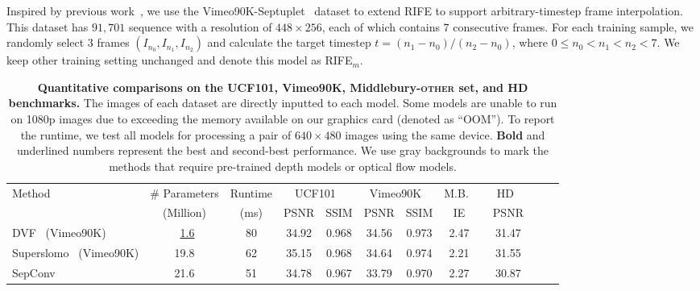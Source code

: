 \documentclass[final]{cvpr}
\def\red#1{\textcolor{MyRed}{#1}}
\def\blue#1{\textcolor{MyBlue}{#1}}
\def\first#1{\red{\textbf{#1}}}
\def\second#1{\blue{\underline{#1}}}
\begin{document}
Inspired by previous work~\cite{kalluri2020flavr, cheng2020multiple}, we use the Vimeo90K-Septuplet~\cite{xue2019video} dataset to extend RIFE to support arbitrary-timestep frame interpolation. This dataset has $91,701$ sequence with a resolution of $448\times256$, each of which contains $7$ consecutive frames. For each training sample, we randomly select $3$ frames $(I_{n_0}, I_{n_1}, I_{n_2})$ and calculate the target timestep $t = (n_1 - n_0) / (n_2 - n_0)$, where $0\leq n_0 < n_1 < n_2 < 7$. We keep other training setting unchanged and denote this model as RIFE$_m$.  	
\begin{table*}
\caption{
		\textbf{Quantitative comparisons on the UCF101, Vimeo90K, Middlebury-\textsc{other} set, and HD benchmarks.} The images of each dataset are directly inputted to each model. Some models are unable to run on 1080p images due to exceeding the memory available on our graphics card (denoted as “OOM”). To report the runtime, we test all models for processing a pair of $640\times 480$ images using the same device. \first{Bold} and \blue{underlined} numbers represent the best and second-best performance. We use gray backgrounds to mark the methods that require pre-trained depth models or optical flow models.
	}
\centering
	\begin{tabular}{lcccccccccc}
		\toprule
\multirow{2}{*}[-0.28em]{Method}  &\# Parameters&
		Runtime
&\multicolumn{2}{c}{UCF101~\cite{soomro2012ucf101}} &\multicolumn{2}{c}{Vimeo90K~\cite{xue2019video}} & M.B.~\cite{baker2011database} & ~~HD~\cite{bao2019depth}~~\\


		
		\cmidrule(l{7pt}r{7pt}){4-5}
		\cmidrule(l{7pt}r{7pt}){6-7}
		\cmidrule(l{5pt}r{5pt}){8-8}
		\cmidrule(l{5pt}r{5pt}){9-9}
\vspace{0.2em}
		&(Million) & (ms) &PSNR & SSIM 	&PSNR & SSIM & IE & PSNR\\
		\addlinespace[-1pt]
		\midrule




			DVF~\cite{xue2019video} (Vimeo90K) &~\second{1.6} &80 & {34.92} & {0.968} &{34.56}& {0.973}  &{2.47} & 31.47 \\
		
		Superslomo~\cite{jiang2018super} (Vimeo90K) &19.8 &62 & {35.15} & {0.968} &{34.64}& {0.974}  &{2.21} & 31.55\\
		
		SepConv~\cite{niklaus2017video} & 21.6 & 51 & 34.78 & 0.967  &33.79& {0.970} &2.27& 30.87 \\
		

\end{tabular}
\end{table*}
\end{document}
